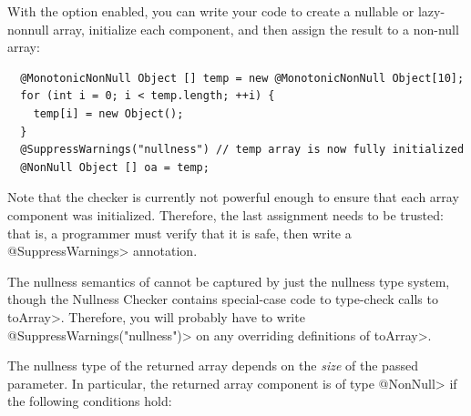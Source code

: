 With the option enabled, you can write your code to create a nullable or
lazy-nonnull array, initialize
each component, and then assign the result to a non-null array:

\begin{Verbatim}
  @MonotonicNonNull Object [] temp = new @MonotonicNonNull Object[10];
  for (int i = 0; i < temp.length; ++i) {
    temp[i] = new Object();
  }
  @SuppressWarnings("nullness") // temp array is now fully initialized
  @NonNull Object [] oa = temp;
\end{Verbatim}

Note that the checker is currently not powerful enough to ensure that
each array component was initialized. Therefore, the last assignment
needs to be trusted:  that is, a programmer must verify that it is safe,
then write a \<@SuppressWarnings> annotation.





The nullness semantics of
cannot be captured by just the nullness type system, though the Nullness
Checker contains special-case code to type-check calls to \<toArray>.
Therefore, you will probably have to write \<@SuppressWarnings("nullness")>
on any overriding definitions of \<toArray>.

The nullness type of the
returned array depends on the \emph{size} of the passed parameter. In particular, the
returned array component is of type \<@NonNull> if the following conditions
hold:

